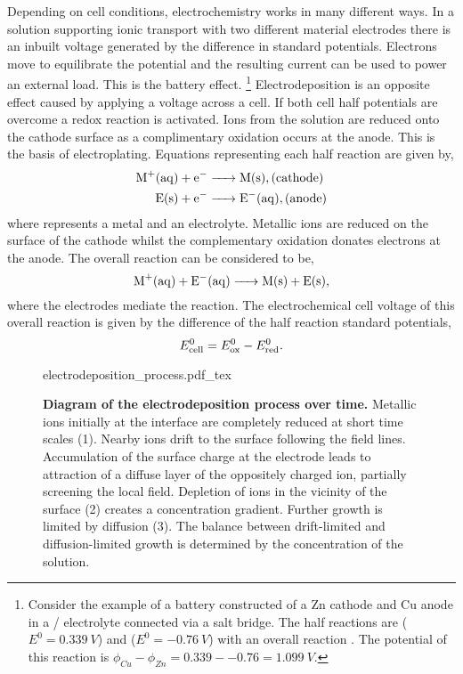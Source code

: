 \documentclass{article}
\begin{document}
Depending on cell conditions, electrochemistry works in many different ways. In a solution supporting ionic transport with two different material electrodes there is an inbuilt voltage generated by the difference in standard potentials. Electrons move to equilibrate the potential and the resulting current can be used to power an external load. This is the battery effect.%
\footnote{Consider the example of a battery constructed of a Zn cathode and Cu anode in a / electrolyte connected via a salt bridge. The half reactions are  ($E^0=\SI{0.339}{V}$) and  ($E^0=\SI{-0.76}{V}$) with an overall reaction . The potential of this reaction is $\phi_{Cu}-\phi_{Zn}=0.339--0.76=\SI{1.099}{V}$.}
Electrodeposition is an opposite effect caused by applying a voltage across a cell. If both cell half potentials are overcome a redox reaction is activated. Ions from the solution are reduced onto the cathode surface as a complimentary oxidation occurs at the anode. This is the basis of electroplating. Equations representing each half reaction are given by,
\begin{subequations}
\begin{align}
\cee{M+(aq) + e- &-> M(s)}, \mathrm{(cathode)} \label{eq:reduction} \\
\cee{E(s) + e- &-> E^-(aq)}, \mathrm{(anode)} \label{eq:oxidation}
\end{align}
\end{subequations}
where  represents a metal and  an electrolyte. Metallic ions are reduced on the surface of the cathode whilst the complementary oxidation donates electrons at the anode. The overall reaction can be considered to be,
\begin{equation} \cee{M+(aq) + E^-(aq) -> M(s) + E(s)}, \label{eq:redox} \end{equation}
where the electrodes mediate the reaction. The electrochemical cell voltage of this overall reaction is given by the difference of the half reaction standard potentials,
\begin{equation} E^0_{\mathrm{cell}} = E^0_{\mathrm{ox}}-E^0_{\mathrm{red}}. \end{equation}

\begin{figure}
{\small
\def\svgwidth{0.9\textwidth}
{electrodeposition_process.pdf_tex}}
\caption[Diagram of the electrodeposition process over time.]{\textbf{Diagram of the electrodeposition process over time.} Metallic ions initially at the interface are completely reduced at short time scales (1). Nearby ions drift to the surface following the field lines. Accumulation of the surface charge at the electrode leads to attraction of a diffuse layer of the oppositely charged ion, partially screening the local field. Depletion of ions in the vicinity of the surface (2) creates a concentration gradient. Further growth is limited by diffusion (3). The balance between drift-limited and diffusion-limited growth is determined by the concentration of the solution.}
\label{fig:electrodeposition_process}
\end{figure}
\end{document}
